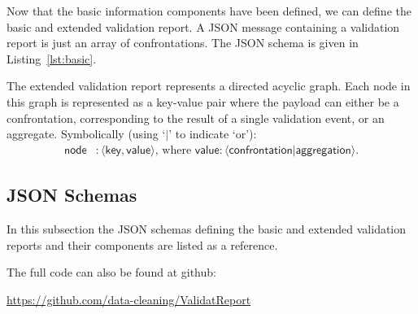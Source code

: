 Now that the basic information components have been defined, we can define the
basic and extended validation report. A JSON message containing a validation
report is just an array of confrontations. The JSON schema is given in
Listing~\ref{lst:basic}.

The extended validation report represents a directed acyclic graph.  Each node
in this graph is represented as a key-value pair where the payload can either
be a confrontation, corresponding to the result of a single validation event,
or an aggregate.  Symbolically (using `$|$' to indicate `or'):
\begin{align}
\label{eq:node}
\textsf{node} &: \langle \textsf{key},\textsf{value}\rangle\textrm{, where }
\textsf{value} : \langle \textsf{confrontation} | \textsf{aggregation}\rangle.
\end{align}


\clearpage{}
\subsection{JSON Schemas}
In this subsection the JSON schemas defining the basic and extended
validation reports and their components are listed as a reference.

The full code can also be found at github:
\begin{center}
\href{https://github.com/data-cleaning/ValidatReport}{https://github.com/data-cleaning/ValidatReport}
\end{center}
%

%
%

%

%

%




%

%





